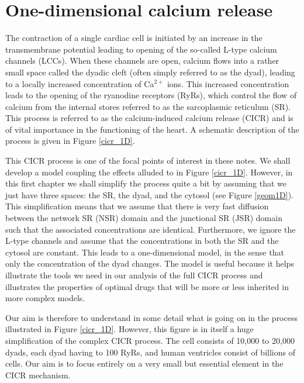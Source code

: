 
\chapter{One-dimensional calcium release}
\label{Ca_release_1D}

The contraction of a single cardiac cell is initiated by an increase in the transmembrane potential leading to opening of the so-called L-type calcium channels (LCCs). When these channels are open, calcium flows into a rather small space called the dyadic cleft (often simply referred to as the dyad), leading to a locally increased concentration of Ca$^{2+}$ ions. This increased concentration leads to  the opening of the ryanodine receptors (RyRs), which control the flow of calcium from the internal stores referred to as the sarcoplasmic reticulum (SR). This process is referred to as the calcium-induced calcium release (CICR) and is of vital importance in the functioning of the heart. A schematic description of the process is given in Figure \ref{cicr_1D}. 


This CICR process is one of the focal points of interest in these notes. We shall develop a model coupling the effects alluded to in Figure \ref{cicr_1D}. However, in this first chapter we shall simplify the process quite a bit by assuming that we just have three spaces: the SR, the dyad, and the cytosol (see Figure \ref{geom1D}). This simplification means that we assume that there is very fast diffusion between the network SR (NSR) domain and the junctional SR (JSR) domain such that the associated concentrations are identical. 
Furthermore, we ignore the L-type channels and assume that the concentrations in both the SR and the cytosol are constant. This leads to a one-dimensional model, in the sense that only the concentration of the dyad changes. The model is useful because it helps illustrate the tools we need in our analysis of the full CICR process and illustrates the properties of optimal drugs that will be more or less inherited in more complex models.  

Our aim is therefore to understand in some detail what is going on in the process illustrated in  Figure \ref{cicr_1D}. However, this figure is in itself a huge simplification of the complex CICR process. The cell consists of 10,000 to 20,000 dyads, each dyad having  to 100 RyRs, and human ventricles consist of billions of cells. Our aim is to focus entirely on a very small but essential element in the CICR mechanism.

